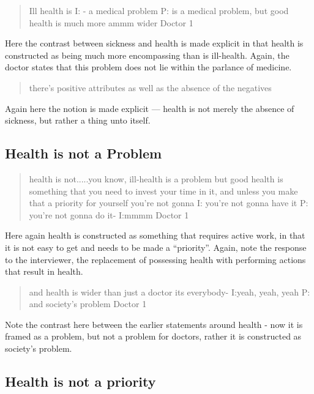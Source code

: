 \begin{quotation}
  
Ill health is 
I: - a medical problem 
P: is a medical problem, but good health is much more ammm wider
Doctor 1
\end{quotation}

Here the contrast between sickness and health is made explicit in that health is constructed as being much more encompassing than is ill-health. Again, the doctor states that this problem does not lie within the parlance of medicine. 

\begin{quotation}
  there's positive attributes as well as the absence of the negatives

\end{quotation}
Again here the notion is made explicit --- health is not merely the absence of sickness, but rather a thing unto itself. 

\subsection{Health is not a Problem}
\label{sec:health-not-problem}

\begin{quotation}
  health is not.....you know, ill-health is a problem but good health is something that you need to invest your time in it, and unless you make that a priority for yourself you're not gonna
I: you're not gonna have it
P: you're not gonna do it-
I:mmmm
Doctor 1
\end{quotation}


Here again health is constructed as something that requires active work, in that it is not easy to get and needs to be made a ``priority''. Again, note the response to the interviewer, the replacement of possessing health with performing actions that result in health. 


\begin{quotation}
    and health is wider than just a doctor its everybody-
I:yeah, yeah, yeah
P: and society's problem 
Doctor 1
\end{quotation}

Note the contrast here between the earlier statements around health - now it is framed as a problem, but not a problem for doctors, rather it is constructed as society's problem. 


\subsection{Health is not a priority}
\label{sec:health-not-priority}


